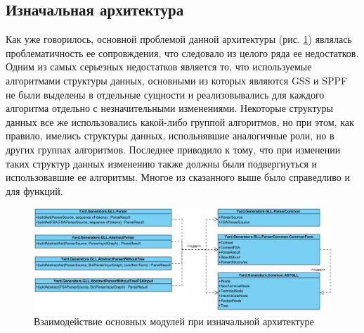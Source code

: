 \documentclass[14pt]{matmex-diploma}
\begin{document}
\newpage
\subsection{Изначальная архитектура}
Как уже говорилось, основной проблемой данной архитектуры (рис. \ref{fig:Old}) являлась проблематичность ее сопровждения, что следовало из целого ряда ее недостатков. Одним из самых серьезных недостатков является то, что используемые алгоритмами структуры данных, основными из которых являются GSS и SPPF не были выделены в отдельные сущности и реализовывались для каждого алгоритма отдельно с незначительными изменениями. Некоторые структуры данных все же использовались какой-либо группой алгоритмов, но при этом, как правило, имелись структуры данных, испольнявшие аналогичные роли, но в других группах алгоритмов. Последнее приводило к тому, что при изменении таких структур данных изменению также должны были подвергнуться и использовавшие ее алгоритмы. Многое из сказанного выше было справедливо и для функций.
\begin{figure}[H]
    \includegraphics[width=\textwidth]{images/Old}
    \caption{Взаимодействие основных модулей при изначальной архитектуре}
    \label{fig:Old}
\end{figure}
\end{document}
